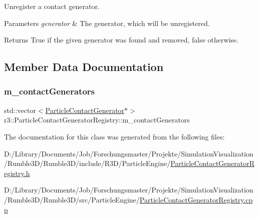 Unregister a contact generator. 


\begin{DoxyParams}{Parameters}
{\em generator} & The generator, which will be unregistered. \\
\hline
\end{DoxyParams}
\begin{DoxyReturn}{Returns}
True if the given generator was found and removed, false otherwise. 
\end{DoxyReturn}


\subsection{Member Data Documentation}
\mbox{\label{classr3_1_1_particle_contact_generator_registry_abefd730c20539681ed0fac53ccd5f8ab}} 
\subsubsection{\texorpdfstring{m\+\_\+contact\+Generators}{m\_contactGenerators}}
{\footnotesize\ttfamily std\+::vector$<$\mbox{\hyperlink{classr3_1_1_particle_contact_generator}{Particle\+Contact\+Generator}}$\ast$$>$ r3\+::\+Particle\+Contact\+Generator\+Registry\+::m\+\_\+contact\+Generators\hspace{0.3cm}{\ttfamily [protected]}}



The documentation for this class was generated from the following files\+:\begin{DoxyCompactItemize}
\item 
D\+:/\+Library/\+Documents/\+Job/\+Forschungsmaster/\+Projekte/\+Simulation\+Visualization/\+Rumble3\+D/\+Rumble3\+D/include/\+R3\+D/\+Particle\+Engine/\mbox{\hyperlink{_particle_contact_generator_registry_8h}{Particle\+Contact\+Generator\+Registry.\+h}}\item 
D\+:/\+Library/\+Documents/\+Job/\+Forschungsmaster/\+Projekte/\+Simulation\+Visualization/\+Rumble3\+D/\+Rumble3\+D/src/\+Particle\+Engine/\mbox{\hyperlink{_particle_contact_generator_registry_8cpp}{Particle\+Contact\+Generator\+Registry.\+cpp}}\end{DoxyCompactItemize}

